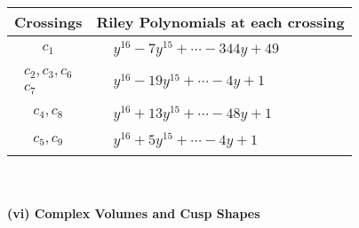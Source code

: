\documentclass[1p]{elsarticle_modified}
\theoremstyle{definition}
\begin{document}
\begin{tabular}{m{50pt}|m{274pt}}
Crossings & \hspace{64pt}Riley Polynomials at each crossing \\
\hline $$\begin{aligned}c_{1}\end{aligned}$$&$\begin{aligned}
&y^{16}-7 y^{15}+\cdots-344 y+49
\end{aligned}$\\
\hline $$\begin{aligned}c_{2},c_{3},c_{6}\\c_{7}\end{aligned}$$&$\begin{aligned}
&y^{16}-19 y^{15}+\cdots-4 y+1
\end{aligned}$\\
\hline $$\begin{aligned}c_{4},c_{8}\end{aligned}$$&$\begin{aligned}
&y^{16}+13 y^{15}+\cdots-48 y+1
\end{aligned}$\\
\hline $$\begin{aligned}c_{5},c_{9}\end{aligned}$$&$\begin{aligned}
&y^{16}+5 y^{15}+\cdots-4 y+1
\end{aligned}$\\
\hline
\end{tabular}\\~\\
\newpage\flushleft \textbf{(vi) Complex Volumes and Cusp Shapes}
\end{document}
